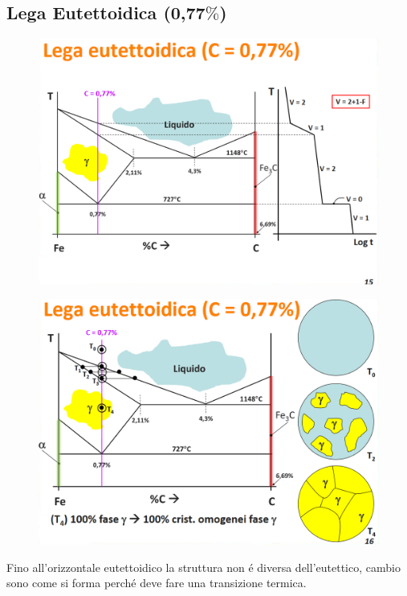 \documentclass{article}
\begin{document}
{        \subsection{Lega Eutettoidica (0,77$\%$)}
            \begin{figure}[h!]
                \centering
                \includegraphics[width=.85\linewidth]{L12 - Diagramma Fe-C - 0,77C - Diagramma e Traiettoria.png}
            \end{figure}
            \begin{figure}[h!]
                \centering
                \includegraphics[width=.85\linewidth]{L12 - Diagramma Fe-C - 0,77C - Cambio di Struttura 1.png}
            \end{figure}
            Fino all'orizzontale eutettoidico la struttura non \'e diversa dell'eutettico, cambio sono come si forma perch\'e deve fare una transizione termica.
            \begin{figure}[h!]
                \centering

\end{figure}}
\end{document}
